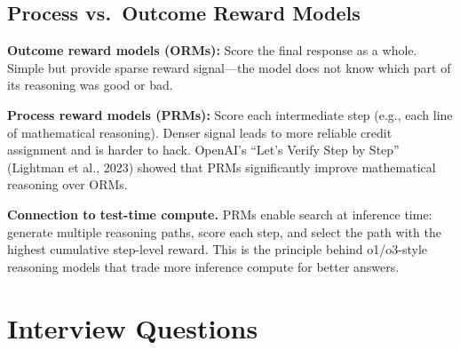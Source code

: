 \subsection{Process vs.\ Outcome Reward Models}

\textbf{Outcome reward models (ORMs):} Score the final response as a whole. Simple but provide sparse reward signal---the model does not know which part of its reasoning was good or bad.

\textbf{Process reward models (PRMs):} Score each intermediate step (e.g., each line of mathematical reasoning). Denser signal leads to more reliable credit assignment and is harder to hack. OpenAI's ``Let's Verify Step by Step'' (Lightman et al., 2023) showed that PRMs significantly improve mathematical reasoning over ORMs.

\textbf{Connection to test-time compute.} PRMs enable search at inference time: generate multiple reasoning paths, score each step, and select the path with the highest cumulative step-level reward. This is the principle behind o1/o3-style reasoning models that trade more inference compute for better answers.

\section{Interview Questions}
\label{sec:rl_interview}



